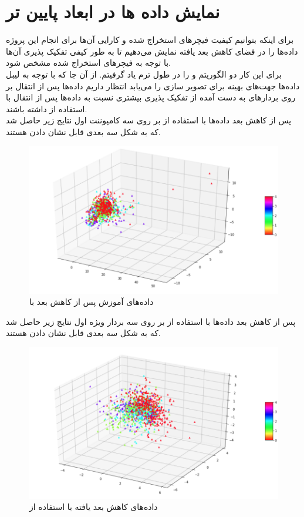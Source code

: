 \section{نمایش داده ها در ابعاد پایین تر} 
برای اینکه بتوانیم کیفیت فیچرهای استخراج شده و کارایی آن‌ها برای انجام این پروژه داده‌ها را در فضای کاهش بعد یافته نمایش می‌دهیم تا به طور کیفی تفکیک پذیری آن‌ها با توجه به فیچرهای استخراج شده مشخص شود.
\\
برای این کار دو الگوریتم  و  را در طول ترم یاد گرفیتم. از آن جا که  با توجه به لیبل داده‌ها جهت‌های بهینه برای تصویر سازی را می‌یابد انتظار داریم داده‌ها پس از انتقال بر روی بردارهای به دست آمده از  تفکیک پذیری بیشتری نسبت به داده‌ها پس از انتقال با استفاده از  داشته باشند.
\\ 
پس از کاهش بعد داده‌ها با استفاده از  بر روی سه کامپوننت اول نتایج زیر حاصل شد که به شکل سه بعدی قابل نشان دادن هستند.

\begin{figure}[h!]
    \centering
    \includegraphics[width=0.5\linewidth]{images/PCA1.png}
    \caption{داده‌های آموزش پس از کاهش بعد با }
    \label{fig:pca_vis}
\end{figure}

پس از کاهش بعد داده‌ها با استفاده از  بر روی سه بردار ویژه اول نتایج زیر حاصل شد که به شکل سه بعدی قابل نشان دادن هستند.

\begin{figure}[h!]
    \centering
    \includegraphics[width=0.5\linewidth]{images/LDA1.png}
    \caption{داده‌های کاهش بعد یافته با استفاده از }
    \label{fig:lda_viz}
\end{figure}
        

